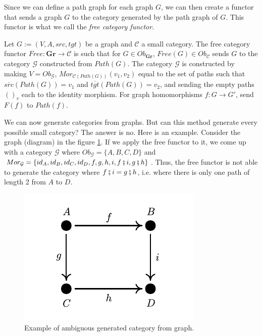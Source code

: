 Since we can define a path graph for each graph $G$, we can then create a functor
that sends a graph $G$ to the category generated by the path graph of $G$. This
functor is what we call the \textit{free category functor}.

\begin{definition}
  Let $G:=(V, A, src, tgt)$ be a graph and $\mathcal C$ a small category. The
  free category functor $Free:\mathbf{Gr} \to \mathcal C$ is such that for
  $G \in Ob_{\mathbf{Gr}}$, $Free(G) \in Ob_{\mathcal C}$ sends $G$ to the
  category $\mathcal G$ constructed from $Path(G)$.
  The category $\mathcal G$ is constructed by making $V = Ob_\mathcal G$,
  $Mor_{\mathcal C(Path(G))}(v_1,v_2)$ equal to the set of paths such that
  $\overline{src}(Path(G)) = v_1$ and $\overline{tgt}(Path(G)) = v_2$, and sending
  the empty paths $()_v$ each to the identity morphism.
  For graph homomorphisms $f:G\to G'$, send $F(f)$ to $Path(f)$.
\end{definition}

We can now generate categories from graphs. But can this method generate
every possible small category? The answer is no. Here is an example.
Consider the graph (diagram) in the figure \ref{fig:Square}.
If we apply the free functor to it, we come up with a category $\mathcal G$
where $Ob_\mathcal G = \{A,B,C,D\}$ and $Mor_\mathcal G = \{id_A,id_B,id_C,id_D, f,g,h,i, f \fatsemi i, g \fatsemi h\}$.
Thus, the free functor is not able to generate the category where $f \fatsemi i = g \fatsemi h$, i.e.
where there is only one path of length 2 from $A$ to $D$.

\begin{figure}[H]
  \begin{center}
    \includegraphics{./notebooks/SquareGraph.pdf}
  \end{center}
  \caption{Example of ambiguous generated category from graph.}
  \label{fig:Square}
\end{figure}

